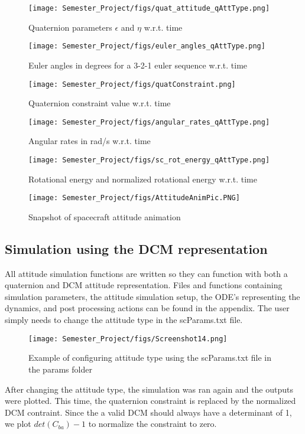 \documentclass[12pt]{article}
\begin{document}
\begin{figure}[H]
\centering
    \texttt{[image: Semester\_Project/figs/quat\_attitude\_qAttType.png]}
    \caption{Quaternion parameters \(\epsilon\) and \(\eta\) w.r.t. time}
\end{figure}
\begin{figure}[H]
\centering
    \texttt{[image: Semester\_Project/figs/euler\_angles\_qAttType.png]}
    \caption{Euler angles in degrees for a 3-2-1 euler sequence w.r.t. time}
\end{figure}
\begin{figure}[H]
\centering
    \texttt{[image: Semester\_Project/figs/quatConstraint.png]}
    \caption{Quaternion constraint value w.r.t. time}
\end{figure}
\begin{figure}[H]
\centering
    \texttt{[image: Semester\_Project/figs/angular\_rates\_qAttType.png]}
    \caption{Angular rates in rad/s w.r.t. time}
\end{figure}
\begin{figure}[H]
\centering
    \texttt{[image: Semester\_Project/figs/sc\_rot\_energy\_qAttType.png]}
    \caption{Rotational energy and normalized rotational energy w.r.t. time}
\end{figure}
\begin{figure}[H]
\centering
    \texttt{[image: Semester\_Project/figs/AttitudeAnimPic.PNG]}
    \caption{Snapshot of spacecraft attitude animation}
\end{figure}

\subsection{Simulation using the DCM representation}
All attitude simulation functions are written so they can function with both a quaternion and DCM attitude representation. Files and functions containing simulation parameters, the attitude simulation setup, the ODE's representing the dynamics, and post processing actions can be found in the appendix. The user simply needs to change the attitude type in the scParams.txt file.
\begin{figure}[H]
\centering
    \texttt{[image: Semester\_Project/figs/Screenshot14.png]}
    \caption{Example of configuring attitude type using the scParams.txt file in the params folder}
\end{figure}
After changing the attitude type, the simulation was ran again and the outputs were plotted. This time, the quaternion constraint is replaced by the normalized DCM contraint. Since the a valid DCM should always have a determinant of 1, we plot $det(C_{ba})-1$ to normalize the constraint to zero.
\end{document}
